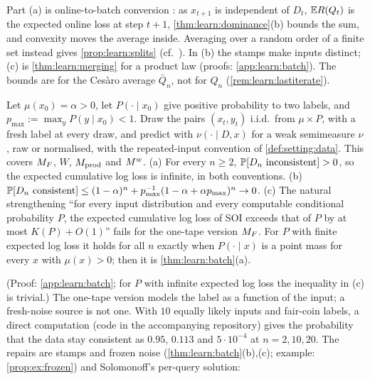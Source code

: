 Part (a) is online-to-batch conversion \citep{littlestone1989online,cesabianchi2004generalization}: as $x_{t+1}$ is independent of $D_t$, $\mathbb{E} R(Q_t)$ is the expected online loss at step $t+1$, \cref{thm:learn:dominance}(b) bounds the sum, and convexity moves the average inside. Averaging over a random order of a finite set instead gives \cref{prop:learn:splits} (cf.\ \citealp{haussler1994predicting}). In (b) the stamps make inputs distinct; (c) is \cref{thm:learn:merging} for a product law (proofs: \cref{app:learn:batch}). The bounds are for the Ces\`aro average $\bar Q_n$, not for $Q_n$ (\cref{rem:learn:lastiterate}).

\begin{proposition}\label{prop:learn:freshnoise}
Let $\mu(x_0)=\alpha>0$, let $P(\cdot\mid x_0)$ give positive probability to two labels, and $p_{\max}:=\max_yP(y\mid x_0)<1$. Draw the pairs $(x_t,y_t)$ i.i.d.\ from $\mu\times P$, with a fresh label at every draw, and predict with $\nu(\cdot\mid D,x)$ for a weak semimeasure $\nu$, raw or normalised, with the repeated-input convention of \cref{def:setting:data}. This covers $M_{F}$, $W$, $M_{\mathrm{prod}}$ and $M^{w}$.
(a) For every $n\ge2$, $\mathbb{P}[D_n\text{ inconsistent}]>0$, so the expected cumulative log loss is infinite, in both conventions.
(b) $\mathbb{P}[D_n\text{ consistent}]\le(1-\alpha)^n+p_{\max}^{-1}(1-\alpha+\alpha p_{\max})^n\to0$.
(c) The natural strengthening ``for every input distribution and every computable conditional probability $P$, the expected cumulative log loss of SOI exceeds that of $P$ by at most $K(P)+O(1)$'' fails for the one-tape version $M_{F}$. For $P$ with finite expected log loss it holds for all $n$ exactly when $P(\cdot\mid x)$ is a point mass for every $x$ with $\mu(x)>0$; then it is \cref{thm:learn:batch}(a).
\end{proposition}

(Proof: \cref{app:learn:batch}; for $P$ with infinite expected log loss the inequality in (c) is trivial.) The one-tape version models the label as a function of the input; a fresh-noise source is not one. With $10$ equally likely inputs and fair-coin labels, a direct computation (code in the accompanying repository) gives the probability that the data stay consistent as $0.95$, $0.113$ and $5\cdot10^{-4}$ at $n=2,10,20$. The repairs are stamps and frozen noise (\cref{thm:learn:batch}(b),(c); example: \cref{prop:ex:frozen}) and Solomonoff's per-query solution:


